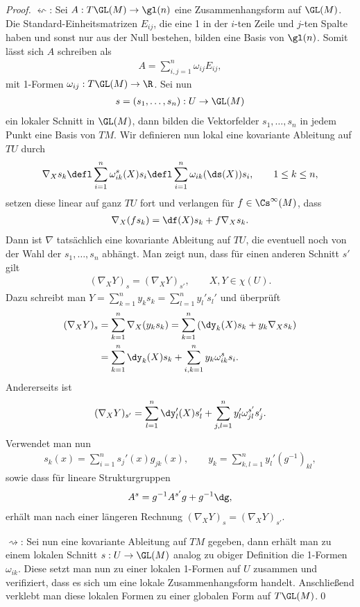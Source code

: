 \documentclass[%
	paper=a5,%
	fleqn,%
	DIV=18,%
	BCOR=0mm,
	fontsize=11pt,
	titlepage=false,%
	bibliography=totoc,
	DIV=18,%
	twoside=true,
	pdftitle=Riemannsche Geometrie,
	pdfauthor=Uwe Semmelmann,
	numbers=noendperiod]%
	{scrbook}
\begin{document}
\begin{proof}

$\leftsquigarrow$: Sei $A: T\GL(M) \to \gl(n)$ eine Zusammenhangsform auf
$\GL(M)$. Die Standard-Einheitsmatrizen $E_{ij}$, die eine 1 in der $i$-ten
Zeile und $j$-ten Spalte haben und sonst nur aus der Null bestehen, bilden eine
Basis von $\gl(n)$. Somit lässt sich $A$ schreiben als
\begin{align*}
A = \sum_{i,j=1}^n \omega_{ij} E_{ij},
\end{align*}
mit 1-Formen $\omega_{ij}: T\GL(M)\to \R$. Sei nun 
\begin{align*}
s=(s_1,\ldots,s_n): U\to \GL(M)
\end{align*}
ein lokaler Schnitt in $\GL(M)$, dann bilden die Vektorfelder $s_1,\ldots,s_n$
in jedem Punkt eine Basis von $TM$. Wir definieren nun lokal eine kovariante
Ableitung auf $TU$ durch
\begin{align*}
\nabla_X s_k \defl \sum_{i=1}^n \omega_{ik}^s(X)s_i
\defl \sum_{i=1}^n \omega_{ik}(\ds(X))s_i,\qquad 1\le k\le n,
\end{align*}
setzen diese linear auf ganz $TU$ fort und verlangen für $f\in\Cs^\infty(M)$,
dass
\begin{align*}
\nabla_X (f s_k) = \df(X) s_k + f\nabla_X s_k.
\end{align*}
Dann ist $\nabla$ tatsächlich eine kovariante Ableitung auf $TU$, die eventuell
noch von der Wahl der $s_1,\ldots,s_n$ abhängt. Man zeigt nun, dass für einen
anderen Schnitt $s'$ gilt
\begin{align*}
(\nabla_X Y)_s = (\nabla_X Y)_{s'},\qquad X,Y\in\chi(U).
\end{align*}
Dazu schreibt man $Y = \sum_{k=1}^n y_k s_k = \sum_{l=1}^n y_l' s_l'$ und
überprüft
\begin{align*}
(\nabla_X Y)_s &= 
\sum_{k=1}^n \nabla_X (y_k s_k)
= \sum_{k=1}^n \left(\dy_k(X) s_k + y_k \nabla_X s_k\right)\\
&= \sum_{k=1}^n \dy_k(X) s_k   + \sum_{i,k=1}^n y_k \omega_{ik}^s s_i.
\end{align*}
Andererseits ist
\begin{align*}
(\nabla_X Y)_{s'} = 
\sum_{l=1}^n \dy_l'(X) s_l'   + \sum_{j,l=1}^n y_l' \omega_{jl}^{s'} s_j'.
\end{align*}
Verwendet man nun
\begin{align*}
s_k(x) = \sum_{i=1}^n s_j'(x)g_{jk}(x),\qquad y_k =
\sum_{k,l=1}^ny_l'(g^{-1})_{kl},
\end{align*}
sowie dass für lineare Strukturgruppen
\begin{align*}
A^s = g^{-1}A^{s'}g + g^{-1}\dg,
\end{align*}
erhält man nach einer längeren Rechnung $(\nabla_X Y)_s = (\nabla_X Y)_{s'}$.

$\rightsquigarrow$: Sei nun eine kovariante Ableitung auf $TM$ gegeben, dann
erhält man zu einem lokalen Schnitt $s: U \to \GL(M)$ analog zu obiger
Definition die 1-Formen $\omega_{ik}$. Diese setzt man nun zu einer lokalen
1-Formen auf $U$ zusammen und verifiziert, dass es sich um eine
lokale Zusammenhangsform handelt. Anschließend verklebt man diese lokalen Formen
zu einer globalen Form auf $T\GL(M)$.\qed
\end{proof}
\end{document}
